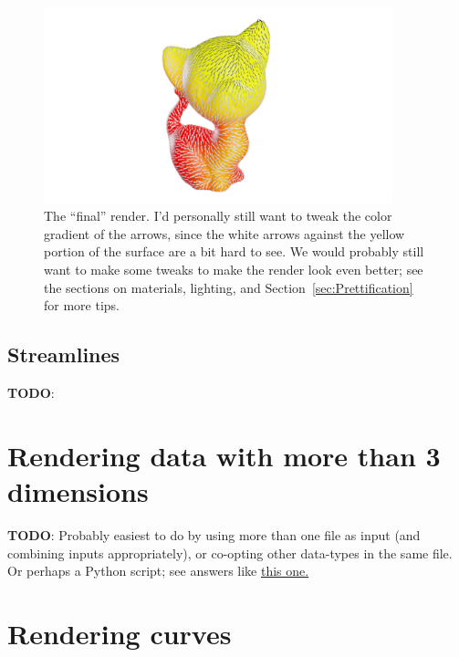 \documentclass[10pt]{article}
\begin{document}
\begin{enumerate}
    \begin{figure}[H]
        \centering
        \captionsetup{width=0.8\textwidth}
        \includegraphics[width=0.9\textwidth]{images/vector_field_final_render.png}
        \caption{The ``final'' render. I'd personally still want to tweak the color gradient of the arrows, since the white arrows against the yellow portion of the surface are a bit hard to see. We would probably still want to make some tweaks to make the render look even better; see the sections on materials, lighting, and Section~\ref{sec:Prettification} for more tips.}
    \end{figure}
\end{enumerate}

\subsection{Streamlines}
\textbf{TODO}:

\section{Rendering data with more than 3 dimensions}
\textbf{TODO}: Probably easiest to do by using more than one file as input (and combining inputs appropriately), or co-opting other data-types in the same file. Or perhaps a Python script; see answers like \href{https://blender.stackexchange.com/a/118494}{this one.}

\section{Rendering curves}
\end{document}
